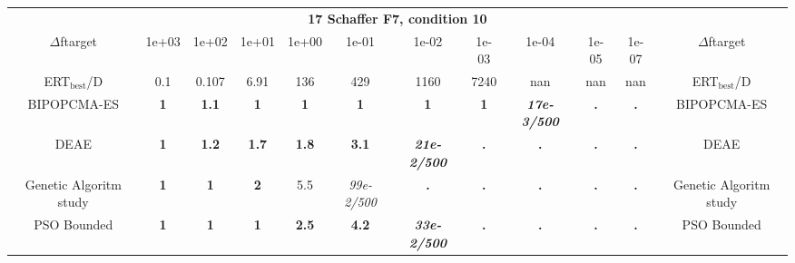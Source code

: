 \begin{tabular}{cccccccccccc}
 & \multicolumn{10}{c}{{\normalsize \textbf{17 Schaffer F7, condition 10}}}\\
$\Delta$ftarget& 1e+03& 1e+02& 1e+01& 1e+00& 1e-01& 1e-02& 1e-03& 1e-04& 1e-05& 1e-07 & $\Delta$ftarget \\
ERT$_{\textrm{best}}$/D& 0.1& 0.107& 6.91& 136& 429& 1160& 7240& nan& nan& nan & ERT$_{\textrm{best}}$/D \\
\hline
BIPOPCMA-ES & \textbf{1} & \textbf{1.1} & \textbf{1} & \textbf{1} & \textbf{1} & \textbf{1} & \textbf{1} & \textbf{\textit{17e-3}\textit{/500}} & \textbf{.} & \textbf{.} & BIPOPCMA-ES \cite{add_an_entry_for_BIPOPCMA-ES_in_bbob.bib}\\
DEAE & \textbf{1} & \textbf{1.2} & \textbf{1.7} & \textbf{1.8} & \textbf{3.1} & \textbf{\textit{21e-2}\textit{/500}} & \textbf{.} & \textbf{.} & \textbf{.} & \textbf{.} & DEAE \cite{add_an_entry_for_DEAE_in_bbob.bib}\\
Genetic Algoritm study & \textbf{1} & \textbf{1} & \textbf{2} & 5.5 & \textit{99e-2}\textit{/500} & \textbf{.} & \textbf{.} & \textbf{.} & \textbf{.} & \textbf{.} & Genetic Algoritm study \cite{add_an_entry_for_Genetic Algoritm study_in_bbob.bib}\\
PSO Bounded & \textbf{1} & \textbf{1} & \textbf{1} & \textbf{2.5} & \textbf{4.2} & \textbf{\textit{33e-2}\textit{/500}} & \textbf{.} & \textbf{.} & \textbf{.} & \textbf{.} & PSO Bounded \cite{add_an_entry_for_PSO Bounded_in_bbob.bib}
\end{tabular}
